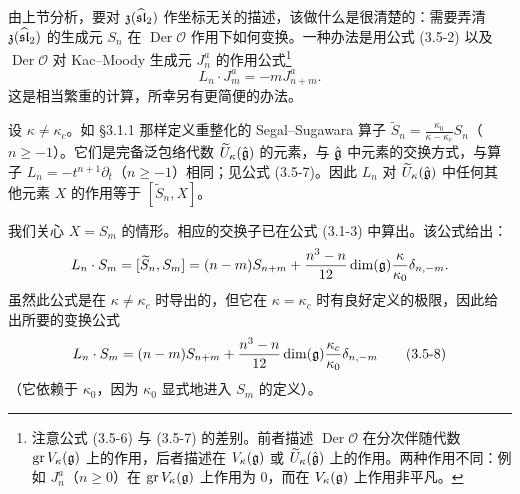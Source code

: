由上节分析，要对 $\mathfrak{z}(\widehat{\mathfrak{sl}}_2)$ 作坐标无关的描述，该做什么是很清楚的：需要弄清 $\mathfrak{z}(\widehat{\mathfrak{sl}}_2)$ 的生成元 $S_n$ 在 $\operatorname{Der}\mathcal{O}$ 作用下如何变换。一种办法是用公式 (3.5-2) 以及 $\operatorname{Der}\mathcal{O}$ 对 Kac–Moody 生成元 $J^a_n$ 的作用公式\footnote{注意公式 (3.5-6) 与 (3.5-7) 的差别。前者描述 $\operatorname{Der}\mathcal{O}$ 在分次伴随代数 $\operatorname{gr}V_\kappa(\mathfrak{g})$ 上的作用，后者描述在 $V_\kappa(\mathfrak{g})$ 或 $\widetilde{U}_\kappa(\hat{\mathfrak{g}})$ 上的作用。两种作用不同：例如 $J^a_n$（$n\ge 0$）在 $\operatorname{gr}V_\kappa(\mathfrak{g})$ 上作用为 0，而在 $V_\kappa(\mathfrak{g})$ 上作用非平凡。}
\begin{equation}
    L_n\cdot J^a_m=-mJ^a_{n+m}.
    \tag{3.5-7}
\end{equation}
这是相当繁重的计算，所幸另有更简便的办法。

设 $\kappa\ne\kappa_c$。如 §3.1.1 那样定义重整化的 Segal–Sugawara 算子 $\widetilde{S}_n=\frac{\kappa_0}{\kappa-\kappa_c}S_n$（$n\ge -1$）。它们是完备泛包络代数 $\widetilde{U}_\kappa(\hat{\mathfrak{g}})$ 的元素，与 $\hat{\mathfrak{g}}$ 中元素的交换方式，与算子 $L_n=-t^{n+1}\partial_t$（$n\ge -1$）相同；见公式 (3.5-7)。因此 $L_n$ 对 $\widetilde{U}_\kappa(\hat{\mathfrak{g}})$ 中任何其他元素 $X$ 的作用等于 $[\widetilde{S}_n,X]$。

我们关心 $X=S_m$ 的情形。相应的交换子已在公式 (3.1-3) 中算出。该公式给出：
\[
    L_n\cdot S_m=[\widetilde{S}_n,S_m]
    =(n-m)S_{n+m}+\frac{n^3-n}{12}\dim(\mathfrak{g})\frac{\kappa}{\kappa_0}\delta_{n,-m}.
\]
虽然此公式是在 $\kappa\ne\kappa_c$ 时导出的，但它在 $\kappa=\kappa_c$ 时有良好定义的极限，因此给出所要的变换公式
\begin{equation}
    L_n\cdot S_m=(n-m)S_{n+m}+\frac{n^3-n}{12}\dim(\mathfrak{g})\frac{\kappa_c}{\kappa_0}\delta_{n,-m}
    \tag{3.5-8}
\end{equation}
（它依赖于 $\kappa_0$，因为 $\kappa_0$ 显式地进入 $S_m$ 的定义）。


